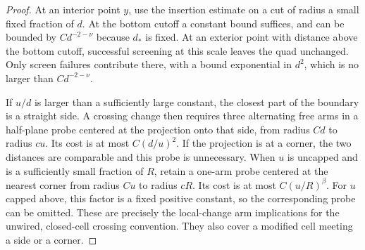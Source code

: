 \begin{proof}
At an interior point $y$, use the insertion estimate on a cut of
radius a small fixed fraction of $d$. At the bottom cutoff a
constant bound suffices, and can be bounded by $Cd^{-2-\nu}$
because $d_*$ is fixed. At an exterior point with distance above
the bottom cutoff, successful screening at this scale leaves the
quad unchanged. Only screen failures contribute there, with a bound
exponential in $d^2$, which is no larger than $Cd^{-2-\nu}$.

If $u/d$ is larger than a sufficiently large constant, the closest
part of the boundary is a straight side. A crossing change then
requires three alternating free arms in a half-plane probe centered
at the projection onto that side, from radius $Cd$ to radius $cu$.
Its cost is at most $C(d/u)^2$. If the projection is at a corner,
the two distances are comparable and this probe is unnecessary.
When $u$ is uncapped and is a sufficiently small fraction of $R$,
retain a one-arm probe centered at the nearest corner from radius
$Cu$ to radius $cR$. Its cost is at most $C(u/R)^\beta$.
For $u$ capped above, this factor is a fixed positive constant,
so the corresponding probe can be omitted. These are precisely
the local-change arm implications for the unwired, closed-cell
crossing convention. They also cover a modified cell meeting a
side or a corner.


\end{proof}

